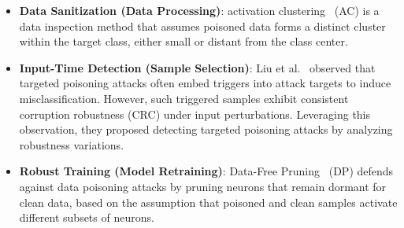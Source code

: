 \begin{itemize}[leftmargin=0.35cm]
	\item \textbf{Data Sanitization (Data Processing)}: activation clustering~\cite{chen2018detecting} (AC) is a data inspection method that assumes poisoned data forms a distinct cluster within the target class, either small or distant from the class center.
	
	\item \textbf{Input-Time Detection (Sample Selection)}: Liu et al.~\cite{2023-ICCV-Trigger-Detect} observed that targeted poisoning attacks often embed triggers into attack targets to induce misclassification.
	However, such triggered samples exhibit consistent corruption robustness (CRC) under input perturbations. Leveraging this observation, they proposed detecting targeted poisoning attacks by analyzing robustness variations.
	
	\item \textbf{Robust Training (Model Retraining)}: Data-Free Pruning~\cite{DFP} (DP) defends against data poisoning attacks by pruning neurons that remain dormant for clean data, based on the assumption that poisoned and clean samples activate different subsets of neurons.
	
	
\end{itemize}

